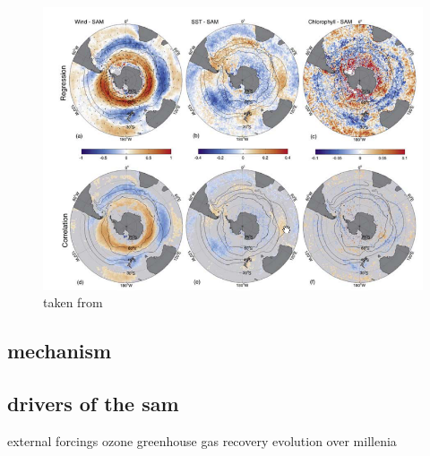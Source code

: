 	\begin{figure}
		\includegraphics[scale=0.75]{pictures/SAM_regression_SST_wind.png}
		\caption{taken from \cite{Lovenduski2005}}
	\end{figure}
	
	
	\subsection*{mechanism}
	\subsection{drivers of the sam}
	external forcings ozone greenhouse gas recovery
	evolution over millenia